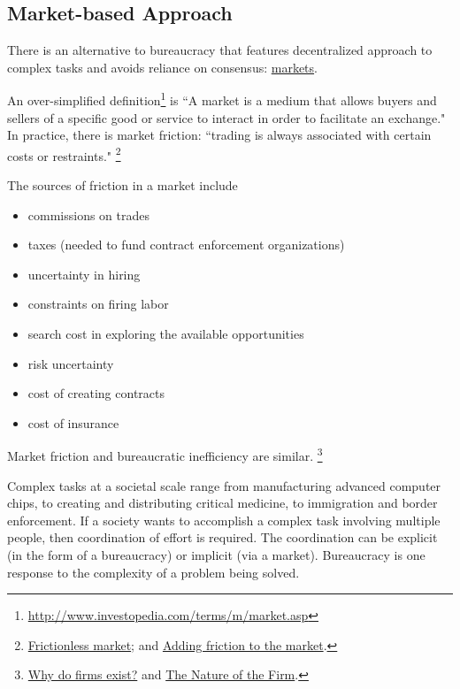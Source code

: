 \subsection{Market-based Approach}

There is an alternative to bureaucracy that features decentralized approach to complex tasks and avoids reliance on consensus: \href{https://en.wikipedia.org/wiki/Market_(economics)}{markets}.

An over-simplified definition\footnote{\href{http://www.investopedia.com/terms/m/market.asp}{http://www.investopedia.com/terms/m/market.asp}} is ``A market is a medium that allows buyers and sellers of a specific good or service to interact in order to facilitate an exchange." 
In practice, there is market friction: ``trading is always associated with certain costs or restraints."
\footnote{\href{http://www.investopedia.com/terms/f/frictionlessmarket.asp}{Frictionless market};
and \href{https://insight.kellogg.northwestern.edu/article/adding_friction_to_the_market}{Adding friction to the market}.}

The sources of friction in a market include
\begin{itemize}
    \item commissions on trades
    \item taxes (needed to fund contract enforcement organizations)
    \item uncertainty in hiring
    \item constraints on firing labor
    \item search cost in exploring the available opportunities
    \item risk uncertainty
    \item cost of creating contracts
    \item cost of insurance
\end{itemize}
Market friction and bureaucratic inefficiency are similar. \footnote{  \href{http://www.economist.com/node/17730360}{Why do firms exist?} and \href{https://en.wikipedia.org/wiki/The_Nature_of_the_Firm}{The Nature of the Firm}.}

Complex tasks at a societal scale range from manufacturing advanced computer chips, to creating and distributing critical medicine, to immigration and border enforcement. 
If a society wants to accomplish a complex task involving multiple people, then coordination of effort is required. The coordination can be explicit (in the form of a bureaucracy) or implicit (via a market).  Bureaucracy is one response to the complexity of a problem being solved.


